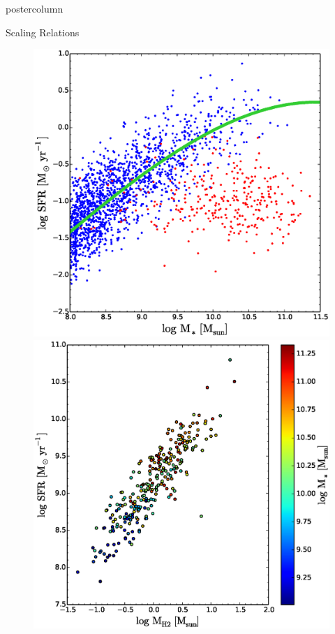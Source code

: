 \documentclass{beamer}
\begin{document}
\begin{frame}
\begin{columns}
\begin{column}{.5\textwidth}
\begin{beamercolorbox}[center,wd=\textwidth]{postercolumn}
\begin{minipage}[T]{.95\textwidth}
{\begin{myblock}{\LARGE Scaling Relations}
						\begin{figure}
							\begin{minipage}{0.4\textwidth}
								\centering\includegraphics[width=\textwidth]{img/MSFR.eps}
								\caption{\cite{saintonge2016SFRMstar}}
							\end{minipage}
							\begin{minipage}{0.4\textwidth}
								\centering\includegraphics[width=\textwidth]{img/scalrelns.eps}
								\caption{}
							\end{minipage}
						\end{figure}


\end{myblock}}
\end{minipage}
\end{beamercolorbox}
\end{column}
\end{columns}
\end{frame}
\end{document}
